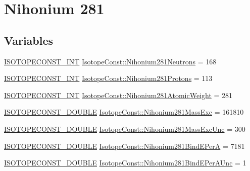 \hypertarget{group___isotope_const-_nihonium-_nh281}{}\section{Nihonium 281}
\label{group___isotope_const-_nihonium-_nh281}
\subsection*{Variables}
\begin{DoxyCompactItemize}
\item 
\mbox{\hyperlink{group___isotope_const-_macros_ga5f18360b3e99483a35c32d789e62621c}{I\+S\+O\+T\+O\+P\+E\+C\+O\+N\+S\+T\+\_\+\+I\+NT}} \mbox{\hyperlink{group___isotope_const-_nihonium-_nh281_ga86c1c0aa70cdc449d02fd5b8f0df7e89}{Isotope\+Const\+::\+Nihonium281\+Neutrons}} = 168
\item 
\mbox{\hyperlink{group___isotope_const-_macros_ga5f18360b3e99483a35c32d789e62621c}{I\+S\+O\+T\+O\+P\+E\+C\+O\+N\+S\+T\+\_\+\+I\+NT}} \mbox{\hyperlink{group___isotope_const-_nihonium-_nh281_ga787c9ce91d1957efe05fd95bd000c76c}{Isotope\+Const\+::\+Nihonium281\+Protons}} = 113
\item 
\mbox{\hyperlink{group___isotope_const-_macros_ga5f18360b3e99483a35c32d789e62621c}{I\+S\+O\+T\+O\+P\+E\+C\+O\+N\+S\+T\+\_\+\+I\+NT}} \mbox{\hyperlink{group___isotope_const-_nihonium-_nh281_ga117d2c46d8a65542b3fc3e9ecb68e661}{Isotope\+Const\+::\+Nihonium281\+Atomic\+Weight}} = 281
\item 
\mbox{\hyperlink{group___isotope_const-_macros_ga8f45a7272ce02c0b4c65c44636ed719a}{I\+S\+O\+T\+O\+P\+E\+C\+O\+N\+S\+T\+\_\+\+D\+O\+U\+B\+LE}} \mbox{\hyperlink{group___isotope_const-_nihonium-_nh281_ga08b7ac37defacb28a1f97e96048ddebe}{Isotope\+Const\+::\+Nihonium281\+Mass\+Exc}} = 161810
\item 
\mbox{\hyperlink{group___isotope_const-_macros_ga8f45a7272ce02c0b4c65c44636ed719a}{I\+S\+O\+T\+O\+P\+E\+C\+O\+N\+S\+T\+\_\+\+D\+O\+U\+B\+LE}} \mbox{\hyperlink{group___isotope_const-_nihonium-_nh281_ga8a4e3ad03dc9f149d4ec2732504ff130}{Isotope\+Const\+::\+Nihonium281\+Mass\+Exc\+Unc}} = 300
\item 
\mbox{\hyperlink{group___isotope_const-_macros_ga8f45a7272ce02c0b4c65c44636ed719a}{I\+S\+O\+T\+O\+P\+E\+C\+O\+N\+S\+T\+\_\+\+D\+O\+U\+B\+LE}} \mbox{\hyperlink{group___isotope_const-_nihonium-_nh281_ga64eeaefdf8e833c43a18fc20c1173a17}{Isotope\+Const\+::\+Nihonium281\+Bind\+E\+PerA}} = 7181
\item 
\mbox{\hyperlink{group___isotope_const-_macros_ga8f45a7272ce02c0b4c65c44636ed719a}{I\+S\+O\+T\+O\+P\+E\+C\+O\+N\+S\+T\+\_\+\+D\+O\+U\+B\+LE}} \mbox{\hyperlink{group___isotope_const-_nihonium-_nh281_gab7c16fd16e924cbf2198b100c067a59e}{Isotope\+Const\+::\+Nihonium281\+Bind\+E\+Per\+A\+Unc}} = 1

\end{DoxyCompactItemize}
